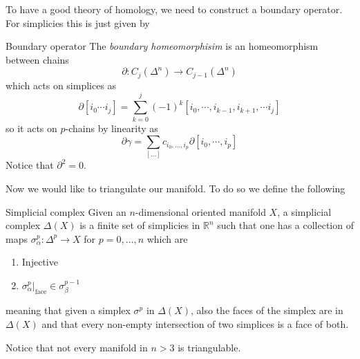 \documentclass[11pt]{article}
\theoremstyle{definition}
\numberwithin{equation}{section}
\newcommand*\bbR{\mathbb{R}}
\begin{document}
To have a good theory of homology, we need to construct a boundary operator. For simplicies this is just given by 
\begin{defn}{Boundary operator}{}
	The \textit{boundary homeomorphisim} is an homeomorphism between chains
	\begin{equation}
		\partial:C_{j}(\Delta^{n})\rightarrow C_{j-1}(\Delta^{n})
	\end{equation}
	which acts on simplices as
	\begin{equation}
		\partial[i_{0}\cdots i_{j}]=\sum_{k=0}^{j}(-1)^{k}[i_{0},\cdots,i_{k-1},i_{k+1},\cdots i_{j}]
	\end{equation}
	so it acts on $p$-chains by linearity as
	\begin{equation}
		\partial\gamma=\sum_{[\ldots]}c_{i_{0},\ldots,i_{p}}\partial[i_{0},\cdots,i_{p}]
	\end{equation}
	Notice that $\partial^{2}=0$.
\end{defn}
Now we would like to triangulate our manifold. To do so we define the following
\begin{defn}{Simplicial complex}{}
	Given an $n$-dimensional oriented manifold $X$, a simplicial complex $\Delta (X)$ is a finite set of simplicies in $\bbR^{n}$ such that one has a collection of maps $\sigma_{\alpha}^{p}:\Delta^{p}\rightarrow X$ for $p=0,\ldots,n$ which are
	\begin{enumerate}
	\item Injective
	\item $\sigma_{\alpha}^{p}\Big |_{\text{face}}\in \sigma^{p-1}_{\beta}$
	\end{enumerate}
meaning that given a simplex $\sigma^{p}$ in $\Delta(X)$, also the faces of the simplex are in $\Delta(X)$ and that every non-empty intersection of two simplices is a face of both.
\end{defn}
Notice that not every manifold in $n>3$ is triangulable.\\
\end{document}
